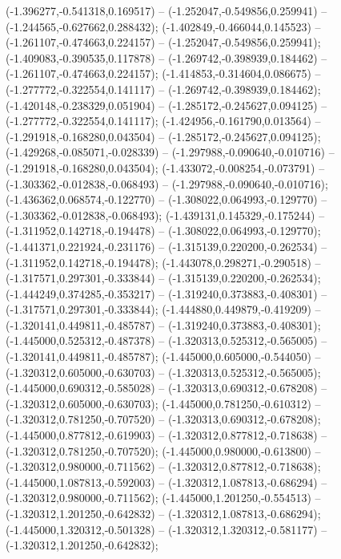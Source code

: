  (-1.396277,-0.541318,0.169517) -- (-1.252047,-0.549856,0.259941) -- (-1.244565,-0.627662,0.288432);
 (-1.402849,-0.466044,0.145523) -- (-1.261107,-0.474663,0.224157) -- (-1.252047,-0.549856,0.259941);
 (-1.409083,-0.390535,0.117878) -- (-1.269742,-0.398939,0.184462) -- (-1.261107,-0.474663,0.224157);
 (-1.414853,-0.314604,0.086675) -- (-1.277772,-0.322554,0.141117) -- (-1.269742,-0.398939,0.184462);
 (-1.420148,-0.238329,0.051904) -- (-1.285172,-0.245627,0.094125) -- (-1.277772,-0.322554,0.141117);
 (-1.424956,-0.161790,0.013564) -- (-1.291918,-0.168280,0.043504) -- (-1.285172,-0.245627,0.094125);
 (-1.429268,-0.085071,-0.028339) -- (-1.297988,-0.090640,-0.010716) -- (-1.291918,-0.168280,0.043504);
 (-1.433072,-0.008254,-0.073791) -- (-1.303362,-0.012838,-0.068493) -- (-1.297988,-0.090640,-0.010716);
 (-1.436362,0.068574,-0.122770) -- (-1.308022,0.064993,-0.129770) -- (-1.303362,-0.012838,-0.068493);
 (-1.439131,0.145329,-0.175244) -- (-1.311952,0.142718,-0.194478) -- (-1.308022,0.064993,-0.129770);
 (-1.441371,0.221924,-0.231176) -- (-1.315139,0.220200,-0.262534) -- (-1.311952,0.142718,-0.194478);
 (-1.443078,0.298271,-0.290518) -- (-1.317571,0.297301,-0.333844) -- (-1.315139,0.220200,-0.262534);
 (-1.444249,0.374285,-0.353217) -- (-1.319240,0.373883,-0.408301) -- (-1.317571,0.297301,-0.333844);
 (-1.444880,0.449879,-0.419209) -- (-1.320141,0.449811,-0.485787) -- (-1.319240,0.373883,-0.408301);
 (-1.445000,0.525312,-0.487378) -- (-1.320313,0.525312,-0.565005) -- (-1.320141,0.449811,-0.485787);
 (-1.445000,0.605000,-0.544050) -- (-1.320312,0.605000,-0.630703) -- (-1.320313,0.525312,-0.565005);
 (-1.445000,0.690312,-0.585028) -- (-1.320313,0.690312,-0.678208) -- (-1.320312,0.605000,-0.630703);
 (-1.445000,0.781250,-0.610312) -- (-1.320312,0.781250,-0.707520) -- (-1.320313,0.690312,-0.678208);
 (-1.445000,0.877812,-0.619903) -- (-1.320312,0.877812,-0.718638) -- (-1.320312,0.781250,-0.707520);
 (-1.445000,0.980000,-0.613800) -- (-1.320312,0.980000,-0.711562) -- (-1.320312,0.877812,-0.718638);
 (-1.445000,1.087813,-0.592003) -- (-1.320312,1.087813,-0.686294) -- (-1.320312,0.980000,-0.711562);
 (-1.445000,1.201250,-0.554513) -- (-1.320312,1.201250,-0.642832) -- (-1.320312,1.087813,-0.686294);
 (-1.445000,1.320312,-0.501328) -- (-1.320312,1.320312,-0.581177) -- (-1.320312,1.201250,-0.642832);
